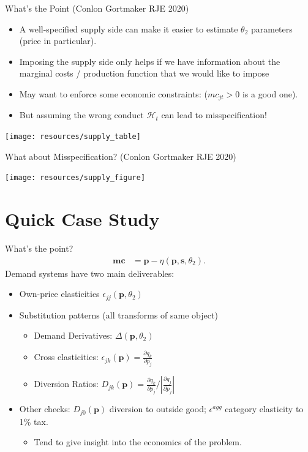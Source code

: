 \documentclass[aspectratio=169,10pt]{beamer}
\begin{document}
\begin{frame}{What's the Point (Conlon Gortmaker RJE 2020)}
\begin{itemize}
\item A well-specified supply side can make it easier to estimate $\theta_2$ parameters (price in particular).
\item Imposing the supply side only helps if we have information about the marginal costs / production function that we would like to impose
\item May want to enforce some economic constraints: ($mc_{jt} > 0$ is a good one).
\item But assuming the wrong conduct $\mathcal{H}_t$ can lead to misspecification!
\end{itemize}
\begin{center}
\texttt{[image: resources/supply\_table]}
\end{center}
\end{frame}



\begin{frame}{What about Misspecification? (Conlon Gortmaker RJE 2020)}
\begin{center}
\texttt{[image: resources/supply\_figure]}
\end{center}
\end{frame}

\section*{Quick Case Study}



\begin{frame}{What's the point?}
\begin{align*}
       \symbf{mc} &=  \symbf{p} - \eta(\symbf{p},\symbf{s},\theta_2).
\end{align*}
Demand systems have two main deliverables:
\begin{itemize}
\item Own-price elasticities $\epsilon_{jj}(\symbf{p},\theta_2)$
\item Substitution patterns (all transforms of same object)
\begin{itemize}
\item Demand Derivatives: $\Delta(\symbf{p},\theta_2)$
\item Cross elasticities: $\epsilon_{jk}(\symbf{p}) = \frac{\partial q_k}{\partial p_j}$
\item Diversion Ratios: $D_{jk}(\symbf{p}) = \frac{\partial q_k}{\partial p_j}/|\frac{\partial q_j}{\partial p_j}|$
\end{itemize}
\item Other checks: $D_{j0}(\symbf{p})$ diversion to outside good; $\epsilon^{agg}$ category elasticity to 1\% tax.
\begin{itemize}
    \item Tend to give insight into the economics of the problem.
\end{itemize}
\end{itemize}
\end{frame}
\end{document}

